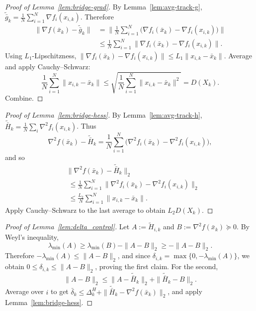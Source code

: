 \documentclass[review,onefignum,onetabnum]{siamart171218}
\begin{document}
\begin{proof}[Proof of Lemma~\ref{lem:bridge-grad}]
By Lemma~\ref{lem:avg-track-g}, $\tilde{\bar g}_k=\frac1N\sum_{i=1}^N\nabla f_i(x_{i,k})$.
Therefore
\begin{align*}
\|\nabla f(\bar x_k)\!-\!\tilde{\bar g}_k\|
&=\Big\|\tfrac1N\textstyle\sum_{i=1}^N\!\big(\nabla f_i(\bar x_k)\!-\!\nabla f_i(x_{i,k})\big)\Big\|\\
&\le \tfrac1N\textstyle\sum_{i=1}^N \|\nabla f_i(\bar x_k)\!-\!\nabla f_i(x_{i,k})\|.
\end{align*}
Using $L_1$-Lipschitzness, $\|\nabla f_i(\bar x_k)-\nabla f_i(x_{i,k})\|\le L_1\|x_{i,k}-\bar x_k\|$.
Average and apply Cauchy--Schwarz:
\[
\frac1N\sum_{i=1}^N\|x_{i,k}-\bar x_k\|
\le \sqrt{\frac1N\sum_{i=1}^N\|x_{i,k}-\bar x_k\|^2}=D(X_k).
\]
Combine.
\end{proof}

\begin{proof}[Proof of Lemma~\ref{lem:bridge-hess}]
By Lemma~\ref{lem:avg-track-h}, $\tilde{\bar H}_k=\frac1N\sum_i \nabla^2 f_i(x_{i,k})$.
Thus
\[
\nabla^2 f(\bar x_k)-\tilde{\bar H}_k
=\frac1N\sum_{i=1}^N\big(\nabla^2 f_i(\bar x_k)-\nabla^2 f_i(x_{i,k})\big),
\]
and so
\begin{align*}
&\|\nabla^2 f(\bar x_k)\!-\!\tilde{\bar H}_k\|_2\\
&\;\le \tfrac1N\textstyle\sum_{i=1}^N\|\nabla^2 f_i(\bar x_k)\!-\!\nabla^2 f_i(x_{i,k})\|_2\\
&\;\le \tfrac{L_2}{N}\textstyle\sum_{i=1}^N\|x_{i,k}\!-\!\bar x_k\|.
\end{align*}
Apply Cauchy--Schwarz to the last average to obtain $L_2 D(X_k)$.
\end{proof}

\begin{proof}[Proof of Lemma~\ref{lem:delta_control}]
Let $A:=\tilde H_{i,k}$ and $B:=\nabla^2 f(\bar x_k)\succeq0$.
By Weyl's inequality,
\[
\lambda_{\min}(A)\ge \lambda_{\min}(B)-\|A-B\|_2\ge -\|A-B\|_2.
\]
Therefore $-\lambda_{\min}(A)\le \|A-B\|_2$, and since $\delta_{i,k}=\max\{0,-\lambda_{\min}(A)\}$,
we obtain $0\le \delta_{i,k}\le \|A-B\|_2$, proving the first claim.
For the second,
\[
\|A-B\|_2\le \|A-\tilde{\bar H}_k\|_2+\|\tilde{\bar H}_k-B\|_2.
\]
Average over $i$ to get $\bar\delta_k\le \Delta_k^H+\|\tilde{\bar H}_k-\nabla^2 f(\bar x_k)\|_2$,
and apply Lemma~\ref{lem:bridge-hess}.
\end{proof}
\end{document}
